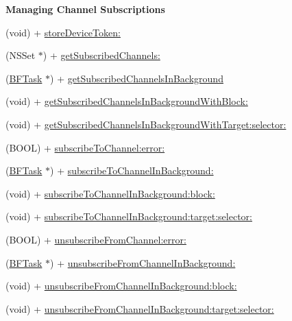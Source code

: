\begin{Indent}{\bf Managing Channel Subscriptions}\par
{\em 

 

 }\begin{DoxyCompactItemize}
\item 
(void) + \hyperlink{interface_p_f_push_a5a32d5110566969b78742e0df3a1358a}{store\+Device\+Token\+:}
\item 
(N\+S\+Set $\ast$) + \hyperlink{interface_p_f_push_ad650374f85d7f28893e9392978d162b9}{get\+Subscribed\+Channels\+:}
\item 
(\hyperlink{interface_b_f_task}{B\+F\+Task} $\ast$) + \hyperlink{interface_p_f_push_a28fd7bddea5a7ac3dae091b27698a9e6}{get\+Subscribed\+Channels\+In\+Background}
\item 
(void) + \hyperlink{interface_p_f_push_a6efb20dfb3193e17bf49b216929f896d}{get\+Subscribed\+Channels\+In\+Background\+With\+Block\+:}
\item 
(void) + \hyperlink{interface_p_f_push_add630e6b01210227cbba590e848126a5}{get\+Subscribed\+Channels\+In\+Background\+With\+Target\+:selector\+:}
\item 
(B\+O\+O\+L) + \hyperlink{interface_p_f_push_a5158b29f91548f7d7c8569be5b80b322}{subscribe\+To\+Channel\+:error\+:}
\item 
(\hyperlink{interface_b_f_task}{B\+F\+Task} $\ast$) + \hyperlink{interface_p_f_push_a705a7125f2f1ff47bd80e9f352200b04}{subscribe\+To\+Channel\+In\+Background\+:}
\item 
(void) + \hyperlink{interface_p_f_push_ae6e7bc77b5dcf183fe0ebb19d4e114e8}{subscribe\+To\+Channel\+In\+Background\+:block\+:}
\item 
(void) + \hyperlink{interface_p_f_push_a6973c612cf162de5a046c6c7503a1752}{subscribe\+To\+Channel\+In\+Background\+:target\+:selector\+:}
\item 
(B\+O\+O\+L) + \hyperlink{interface_p_f_push_ac6d89f2e60452417125528e3fd06eb5b}{unsubscribe\+From\+Channel\+:error\+:}
\item 
(\hyperlink{interface_b_f_task}{B\+F\+Task} $\ast$) + \hyperlink{interface_p_f_push_a697a78ecd8e6c9f080600a7e903bb976}{unsubscribe\+From\+Channel\+In\+Background\+:}
\item 
(void) + \hyperlink{interface_p_f_push_a4951ab01bb19c746a0bd3b2e5187f99e}{unsubscribe\+From\+Channel\+In\+Background\+:block\+:}
\item 
(void) + \hyperlink{interface_p_f_push_ae6ff1898c6f3f657c7ec95dcda92a99b}{unsubscribe\+From\+Channel\+In\+Background\+:target\+:selector\+:}
\end{DoxyCompactItemize}
\end{Indent}
